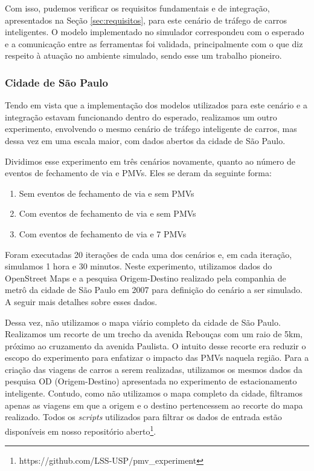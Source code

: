 Com isso, pudemos verificar os requisitos fundamentais e de integração, apresentados na Seção \ref{sec:requisitos}, para este cenário de tráfego de carros inteligentes.
O modelo implementado no simulador correspondeu com o esperado e a comunicação entre as ferramentas foi validada, principalmente com o que diz respeito à atuação no ambiente simulado, sendo esse um
trabalho pioneiro.

\subsubsection{Cidade de São Paulo}
\label{sec:smart_traffic}

Tendo em vista que a implementação dos modelos utilizados para este cenário e a integração estavam funcionando dentro do esperado, realizamos um outro experimento, envolvendo o mesmo cenário de tráfego 
inteligente de carros, mas dessa vez em uma escala maior, com dados abertos da cidade de São Paulo.

Dividimos esse experimento em três cenários novamente, quanto ao número de eventos de fechamento de via e PMVs. Eles se deram da seguinte forma:

\begin{enumerate}
    \item Sem eventos de fechamento de via e sem PMVs

    \item Com eventos de fechamento de via e sem PMVs

    \item Com eventos de fechamento de via e 7 PMVs
\end{enumerate}

Foram executadas 20 iterações de cada uma dos cenários e, em cada iteração, simulamos 1 hora e 30 minutos.
Neste experimento, utilizamos dados do OpenStreet Maps e a pesquisa Origem-Destino realizado pela companhia de metrô da cidade de São Paulo em 2007 para definição do cenário a ser simulado.
A seguir mais detalhes sobre esses dados.

Dessa vez, não utilizamos o mapa viário completo da cidade de São Paulo.
Realizamos um recorte de um trecho da avenida Rebouças com um raio de 5km, próximo ao cruzamento da avenida Paulista.
O intuito desse recorte era reduzir o escopo do experimento para enfatizar o impacto das PMVs naquela região.
Para a criação das viagens de carros a serem realizadas, utilizamos os mesmos dados da pesquisa OD (Origem-Destino) apresentada no experimento de estacionamento inteligente.
Contudo, como não utilizamos o mapa completo da cidade, filtramos apenas as viagens em que a origem e o destino pertencessem ao recorte do mapa realizado.
Todos os \textit{scripts} utilizados para filtrar os dados de entrada estão disponíveis em nosso repositório aberto\footnote{https://github.com/LSS-USP/pmv\_experiment}.

